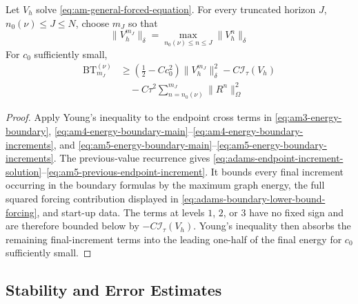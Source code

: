 \documentclass[11pt]{article}
\begin{document}
\begin{lem}
\label{lem:adams-boundary-lower-bound}
Let \(V_h\) solve \eqref{eq:am-general-forced-equation}. For every truncated
horizon \(J\), \(n_0(\nu)\le J\le N\), choose \(m_J\) so that
\begin{equation}
\|V_h^{m_J}\|_{\delta}
=\max_{n_0(\nu)\le n\le J}\|V_h^n\|_{\delta} \label{eq:adams-maximum-energy-index}
\end{equation}
For \(c_0\) sufficiently small,
\begin{align}
\mathrm{BT}_{m_J}^{(\nu)}
&\ge\left(\frac12-Cc_0^2\right)
\|V_h^{m_J}\|_{\delta}^2
-C\mathcal I_{\tau}(V_h) \label{eq:adams-boundary-lower-bound-solution}\\
&\quad-C\tau^2\sum_{n=n_0(\nu)}^{m_J}\|R^n\|_{\Omega}^2
\label{eq:adams-boundary-lower-bound-forcing}
\end{align}
\end{lem}
\begin{proof}
Apply Young's inequality to the endpoint cross terms in
\eqref{eq:am3-energy-boundary},
\eqref{eq:am4-energy-boundary-main}--\eqref{eq:am4-energy-boundary-increments},
and \eqref{eq:am5-energy-boundary-main}--\eqref{eq:am5-energy-boundary-increments}.
The previous-value recurrence gives
\eqref{eq:adams-endpoint-increment-solution}--\eqref{eq:am5-previous-endpoint-increment}.
It bounds every final increment occurring in the boundary formulas by the
maximum graph energy, the full squared forcing contribution displayed in
\eqref{eq:adams-boundary-lower-bound-forcing}, and start-up data. The terms at
levels \(1\), \(2\), or \(3\) have no fixed sign and are therefore bounded
below by \(-C\mathcal I_{\tau}(V_h)\). Young's inequality then absorbs the
remaining final-increment terms into the leading one-half of the final
energy for \(c_0\) sufficiently small.
\end{proof}


\subsection{Stability and Error Estimates}
\label{subsec:adams-stability-error}
\end{document}
